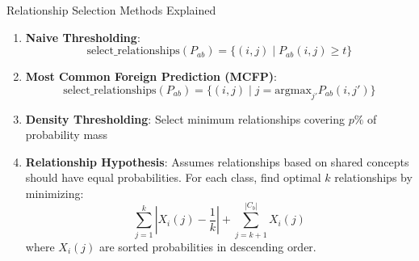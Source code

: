 \documentclass[aspectratio=169]{beamer}
\begin{document}
\begin{frame}{Relationship Selection Methods Explained}
    \begin{enumerate}
        \item \textbf{Naive Thresholding}:
              \begin{equation}
                  \text{select\_relationships}(P_{ab}) = \{(i, j) \mid P_{ab}(i, j) \geq t\}
              \end{equation}

        \item \textbf{Most Common Foreign Prediction (MCFP)}:
              \begin{equation}
                  \text{select\_relationships}(P_{ab}) = \{(i, j) \mid j = \text{argmax}_{j'} P_{ab}(i, j')\}
              \end{equation}

        \item \textbf{Density Thresholding}: Select minimum relationships covering $p\%$ of probability mass

        \item \textbf{Relationship Hypothesis}: Assumes relationships based on shared concepts should have equal probabilities. For each class, find optimal $k$ relationships by minimizing:
              \begin{equation}
                  \sum_{j=1}^k \left| X_i(j) - \frac{1}{k} \right| + \sum_{j=k+1}^{|C_b|} X_i(j)
              \end{equation}
              where $X_i(j)$ are sorted probabilities in descending order.
    \end{enumerate}
\end{frame}
\end{document}
